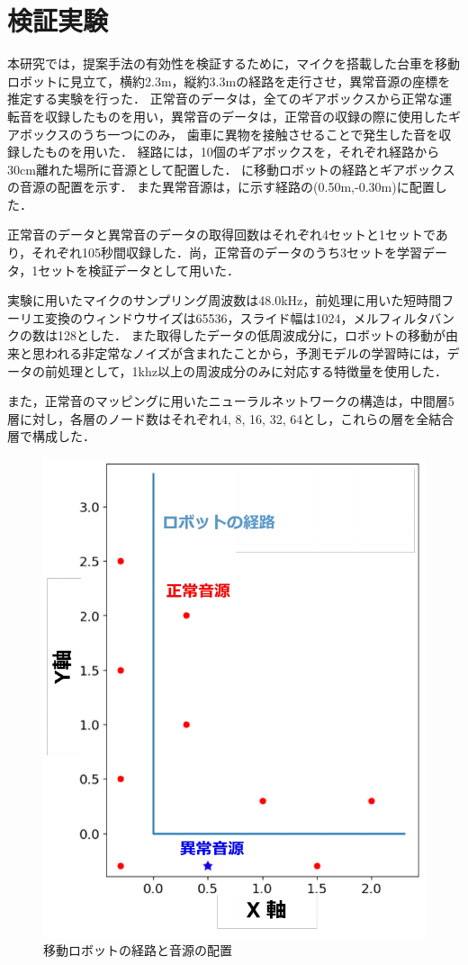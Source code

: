 \documentclass[../main]{subfiles}
\begin{document}
\graphicspath{{../figures/}}

\section{検証実験}
本研究では，提案手法の有効性を検証するために，マイクを搭載した台車を移動ロボットに見立て，横約2.3m，縦約3.3mの経路を走行させ，異常音源の座標を推定する実験を行った．
正常音のデータは，全てのギアボックスから正常な運転音を収録したものを用い，異常音のデータは，正常音の収録の際に使用したギアボックスのうち一つにのみ，
歯車に異物を接触させることで発生した音を収録したものを用いた．
経路には，10個のギアボックスを，それぞれ経路から30cm離れた場所に音源として配置した．
に移動ロボットの経路とギアボックスの音源の配置を示す．
また異常音源は，に示す経路の(0.50m,-0.30m)に配置した．


正常音のデータと異常音のデータの取得回数はそれぞれ4セットと1セットであり，それぞれ105秒間収録した．尚，正常音のデータのうち3セットを学習データ，1セットを検証データとして用いた．


実験に用いたマイクのサンプリング周波数は48.0kHz，前処理に用いた短時間フーリエ変換のウィンドウサイズは65536，スライド幅は1024，メルフィルタバンクの数は128とした．
また取得したデータの低周波成分に，ロボットの移動が由来と思われる非定常なノイズが含まれたことから，予測モデルの学習時には，データの前処理として，1khz以上の周波成分のみに対応する特徴量を使用した．

また，正常音のマッピングに用いたニューラルネットワークの構造は，中間層5層に対し，各層のノード数はそれぞれ4, 8, 16, 32, 64とし，これらの層を全結合層で構成した．

\begin{figure}[tb]
  \centering
  \includegraphics[keepaspectratio, width=0.8\linewidth]{route.pdf}
  \caption{移動ロボットの経路と音源の配置}
\end{figure}
\end{document}
